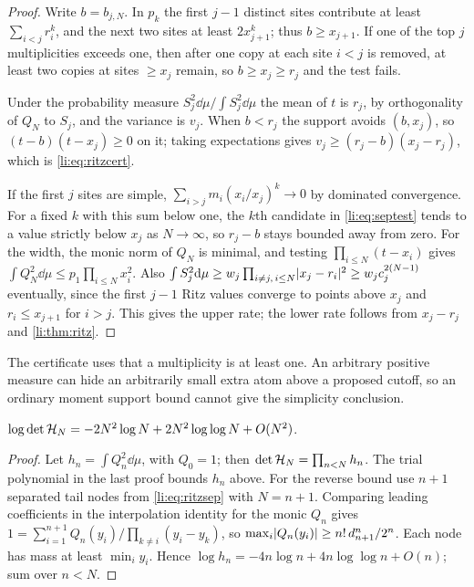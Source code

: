\begin{proof}
Write $b=b_{j,N}$. In $p_k$ the first $j-1$ distinct sites contribute at least $\sum_{i<j}r_i^k$,
and the next two sites at least $2x_{j+1}^k$; thus $b\ge x_{j+1}$. If one of the top $j$
multiplicities exceeds one, then after one copy at each site $i<j$ is removed, at least two copies
at sites $\ge x_j$ remain, so $b\ge x_j\ge r_j$ and the test fails.

Under the probability measure $S_j^2\dd\mu/\int S_j^2\dd\mu$ the mean of $t$ is $r_j$, by
orthogonality of $Q_N$ to $S_j$, and the variance is $v_j$. When $b<r_j$ the support avoids
$(b,x_j)$, so $(t-b)(t-x_j)\ge0$ on it; taking expectations gives $v_j\ge(r_j-b)(x_j-r_j)$, which is
\eqref{li:eq:ritzcert}.

If the first $j$ sites are simple, $\sum_{i>j}m_i(x_i/x_j)^k\to0$ by dominated convergence. For a
fixed $k$ with this sum below one, the $k$th candidate in \eqref{li:eq:septest} tends to a value
strictly below $x_j$ as $N\to\infty$, so $r_j-b$ stays bounded away from zero. For the width, the
monic norm of $Q_N$ is minimal, and testing $\prod_{i\le N}(t-x_i)$ gives
$\int Q_N^2\dd\mu\le p_1\prod_{i\le N}x_i^2$. Also
$\int S_j^2\mathrm{d}\mu\ge w_j\prod_{i\ne j,\,i\le N}\lvert x_j-r_i\rvert^2\ge w_jc_j^{2(N-1)}$ eventually, since
the first $j-1$ Ritz values converge to points above $x_j$ and $r_i\le x_{j+1}$ for $i>j$. This
gives the upper rate; the lower rate follows from $x_j-r_j$ and \cref{li:thm:ritz}.
\end{proof}

The certificate uses that a multiplicity is at least one. An arbitrary positive measure can hide an
arbitrarily small extra atom above a proposed cutoff, so an ordinary moment support bound cannot
give the simplicity conclusion.

\begin{corollary}\label{li:cor:hankel}
$\log\det\mathcal{H}_N=-2N^2\log N+2N^2\log\log N+O(N^2)$.
\end{corollary}

\begin{proof}
Let $h_n=\int Q_n^2\dd\mu$, with $Q_0=1$; then $\det\mathcal{H}_N=\prod_{n<N}h_n$. The trial polynomial
in the last proof bounds $h_n$ above. For the reverse bound use $n+1$ separated tail nodes from
\eqref{li:eq:ritzsep} with $N=n+1$. Comparing leading coefficients in the interpolation identity
for the monic $Q_n$ gives
$1=\sum_{i=1}^{n+1}Q_n(y_i)/\prod_{k\ne i}(y_i-y_k)$, so $\max_i\lvert Q_n(y_i)\rvert\ge n!\,d_{n+1}^n/2^n$.
Each node has mass at least $\min_iy_i$. Hence $\log h_n=-4n\log n+4n\log\log n+O(n)$; sum over
$n<N$.
\end{proof}

